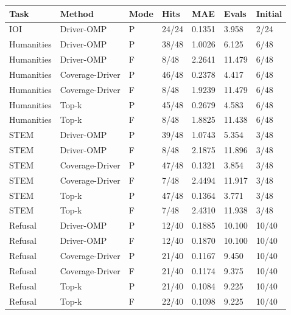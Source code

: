 \begin{tabular}{lllllll}
\toprule
Task & Method & Mode & Hits & MAE & Evals & Initial \\
\midrule
IOI & Driver-OMP & P & 24/24 & 0.1351 & 3.958 & 2/24 \\
Humanities & Driver-OMP & P & 38/48 & 1.0026 & 6.125 & 6/48 \\
Humanities & Driver-OMP & F & 8/48 & 2.2641 & 11.479 & 6/48 \\
Humanities & Coverage-Driver & P & 46/48 & 0.2378 & 4.417 & 6/48 \\
Humanities & Coverage-Driver & F & 8/48 & 1.9239 & 11.479 & 6/48 \\
Humanities & Top-k & P & 45/48 & 0.2679 & 4.583 & 6/48 \\
Humanities & Top-k & F & 8/48 & 1.8825 & 11.438 & 6/48 \\
STEM & Driver-OMP & P & 39/48 & 1.0743 & 5.354 & 3/48 \\
STEM & Driver-OMP & F & 8/48 & 2.1875 & 11.896 & 3/48 \\
STEM & Coverage-Driver & P & 47/48 & 0.1321 & 3.854 & 3/48 \\
STEM & Coverage-Driver & F & 7/48 & 2.4494 & 11.917 & 3/48 \\
STEM & Top-k & P & 47/48 & 0.1364 & 3.771 & 3/48 \\
STEM & Top-k & F & 7/48 & 2.4310 & 11.938 & 3/48 \\
Refusal & Driver-OMP & P & 12/40 & 0.1885 & 10.100 & 10/40 \\
Refusal & Driver-OMP & F & 12/40 & 0.1870 & 10.100 & 10/40 \\
Refusal & Coverage-Driver & P & 21/40 & 0.1167 & 9.450 & 10/40 \\
Refusal & Coverage-Driver & F & 21/40 & 0.1174 & 9.375 & 10/40 \\
Refusal & Top-k & P & 21/40 & 0.1084 & 9.225 & 10/40 \\
Refusal & Top-k & F & 22/40 & 0.1098 & 9.225 & 10/40 \\
\bottomrule
\end{tabular}
